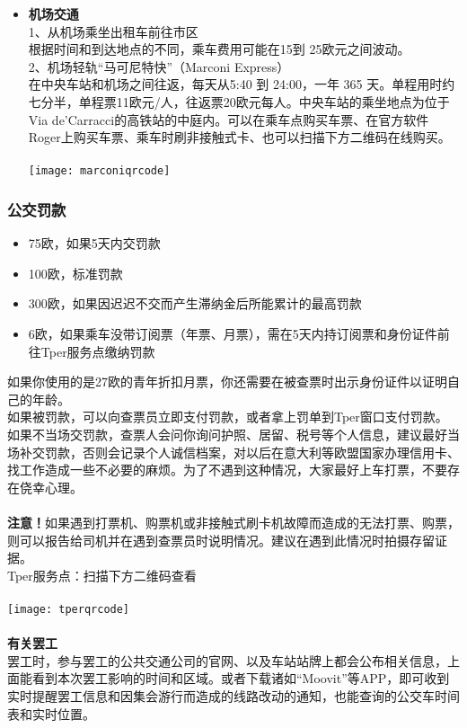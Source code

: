 \begin{itemize}
\item  \textbf{机场交通}\\
1、从机场乘坐出租车前往市区\\
根据时间和到达地点的不同，乘车费用可能在15到 25欧元之间波动。\\
2、机场轻轨“马可尼特快”（Marconi Express）\\
在中央车站和机场之间往返，每天从5:40 到 24:00，一年 365 天。单程用时约七分半，单程票11欧元/人，往返票20欧元每人。中央车站的乘坐地点为位于Via de'Carracci的高铁站的中庭内。可以在乘车点购买车票、在官方软件Roger上购买车票、乘车时刷非接触式卡、也可以扫描下方二维码在线购买。\\
\\
\texttt{[image: marconiqrcode]}


\end{itemize}


\subsubsection{公交罚款}
\begin{itemize}
\item  75欧，如果5天内交罚款
\item  100欧，标准罚款
\item  300欧，如果因迟迟不交而产生滞纳金后所能累计的最高罚款
\item  6欧，如果乘车没带订阅票（年票、月票），需在5天内持订阅票和身份证件前往Tper服务点缴纳罚款
\end{itemize}
如果你使用的是27欧的青年折扣月票，你还需要在被查票时出示身份证件以证明自己的年龄。\\
如果被罚款，可以向查票员立即支付罚款，或者拿上罚单到Tper窗口支付罚款。如果不当场交罚款，查票人会问你询问护照、居留、税号等个人信息，建议最好当场补交罚款，否则会记录个人诚信档案，对以后在意大利等欧盟国家办理信用卡、找工作造成一些不必要的麻烦。为了不遇到这种情况，大家最好上车打票，不要存在侥幸心理。\\
\\
\textbf{注意！}如果遇到打票机、购票机或非接触式刷卡机故障而造成的无法打票、购票，则可以报告给司机并在遇到查票员时说明情况。建议在遇到此情况时拍摄存留证据。\\
Tper服务点：扫描下方二维码查看\\
\\
\texttt{[image: tperqrcode]}
\\
\\
\textbf{有关罢工}\\
罢工时，参与罢工的公共交通公司的官网、以及车站站牌上都会公布相关信息，上面能看到本次罢工影响的时间和区域。或者下载诸如“Moovit”等APP，即可收到实时提醒罢工信息和因集会游行而造成的线路改动的通知，也能查询的公交车时间表和实时位置。\\



